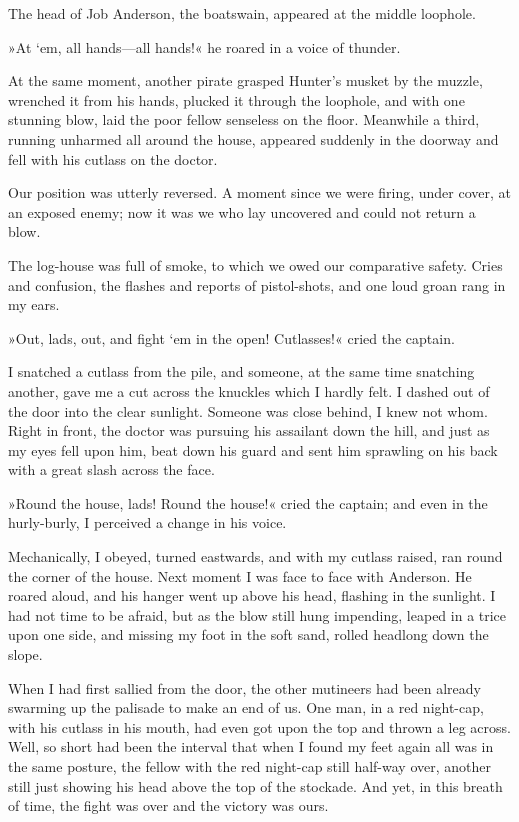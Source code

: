The head of Job Anderson, the boatswain, appeared at the middle loophole.

»At `em, all hands—all hands!« he roared in a voice of thunder.

At the same moment, another pirate grasped Hunter's musket by the muzzle, wrenched it from his hands, plucked it through the loophole, and with one stunning blow, laid the poor fellow senseless on the floor. Meanwhile a third, running unharmed all around the house, appeared suddenly in the doorway and fell with his cutlass on the doctor.

Our position was utterly reversed. A moment since we were firing, under cover, at an exposed enemy; now it was we who lay uncovered and could not return a blow.

The log-house was full of smoke, to which we owed our comparative safety. Cries and confusion, the flashes and reports of pistol-shots, and one loud groan rang in my ears.

»Out, lads, out, and fight `em in the open! Cutlasses!« cried the captain.

I snatched a cutlass from the pile, and someone, at the same time snatching another, gave me a cut across the knuckles which I hardly felt. I dashed out of the door into the clear sunlight. Someone was close behind, I knew not whom. Right in front, the doctor was pursuing his assailant down the hill, and just as my eyes fell upon him, beat down his guard and sent him sprawling on his back with a great slash across the face.

»Round the house, lads! Round the house!« cried the captain; and even in the hurly-burly, I perceived a change in his voice.

Mechanically, I obeyed, turned eastwards, and with my cutlass raised, ran round the corner of the house. Next moment I was face to face with Anderson. He roared aloud, and his hanger went up above his head, flashing in the sunlight. I had not time to be afraid, but as the blow still hung impending, leaped in a trice upon one side, and missing my foot in the soft sand, rolled headlong down the slope.

When I had first sallied from the door, the other mutineers had been already swarming up the palisade to make an end of us. One man, in a red night-cap, with his cutlass in his mouth, had even got upon the top and thrown a leg across. Well, so short had been the interval that when I found my feet again all was in the same posture, the fellow with the red night-cap still half-way over, another still just showing his head above the top of the stockade. And yet, in this breath of time, the fight was over and the victory was ours.

